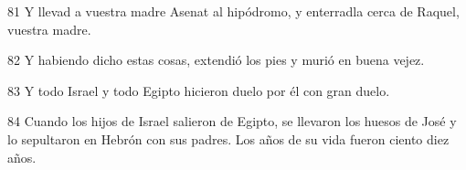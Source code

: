 \par 81 Y llevad a vuestra madre Asenat al hipódromo, y enterradla cerca de Raquel, vuestra madre.

\par 82 Y habiendo dicho estas cosas, extendió los pies y murió en buena vejez.

\par 83 Y todo Israel y todo Egipto hicieron duelo por él con gran duelo.

\par 84 Cuando los hijos de Israel salieron de Egipto, se llevaron los huesos de José y lo sepultaron en Hebrón con sus padres. Los años de su vida fueron ciento diez años.





